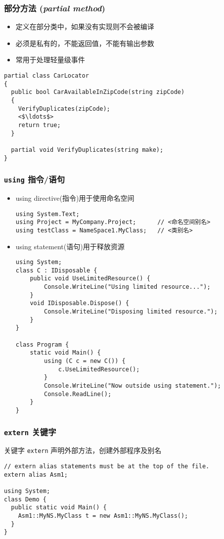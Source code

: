 \begin{frame}[fragile]
\frametitle{部分方法 (\textit{partial method})}
\begin{itemize}
\item 定义在部分类中，如果没有实现则不会被编译
\item 必须是私有的，不能返回值，不能有输出参数
\item 常用于处理轻量级事件
\end{itemize}
\begin{lstlisting}[escapeinside=<>]
partial class CarLocator
{
  public bool CarAvailableInZipCode(string zipCode)
  {
    VerifyDuplicates(zipCode);
    <$\ldots$>
    return true;
  }

  partial void VerifyDuplicates(string make);
}
\end{lstlisting}
\end{frame}


\begin{frame}[fragile]
\frametitle{\texttt{using} 指令/语句}
\begin{itemize}
\item using directive(指令)用于使用命名空间
\begin{lstlisting}[escapeinside=<>]
using System.Text;
using Project = MyCompany.Project;      // <命名空间别名>
using testClass = NameSpace1.MyClass;   // <类别名>

\end{lstlisting}
\item using statement(语句)用于释放资源
\lstset{basicstyle=\tiny\ttfamily}
\begin{lstlisting}
using System;
class C : IDisposable {
    public void UseLimitedResource() {
        Console.WriteLine("Using limited resource...");
    }
    void IDisposable.Dispose() {
        Console.WriteLine("Disposing limited resource.");
    }
}

class Program {
    static void Main() {
        using (C c = new C()) {
            c.UseLimitedResource();
        }
        Console.WriteLine("Now outside using statement.");
        Console.ReadLine();
    }
}
\end{lstlisting}
\end{itemize}
\end{frame}


\begin{frame}[fragile]
\frametitle{\texttt{extern} 关键字}
关键字 \texttt{extern} 声明外部方法，创建外部程序及别名

\begin{lstlisting}
// extern alias statements must be at the top of the file.
extern alias Asm1;

using System;
class Demo {
  public static void Main() {
    Asm1::MyNS.MyClass t = new Asm1::MyNS.MyClass();
  }
}
\end{lstlisting}

\end{frame}

